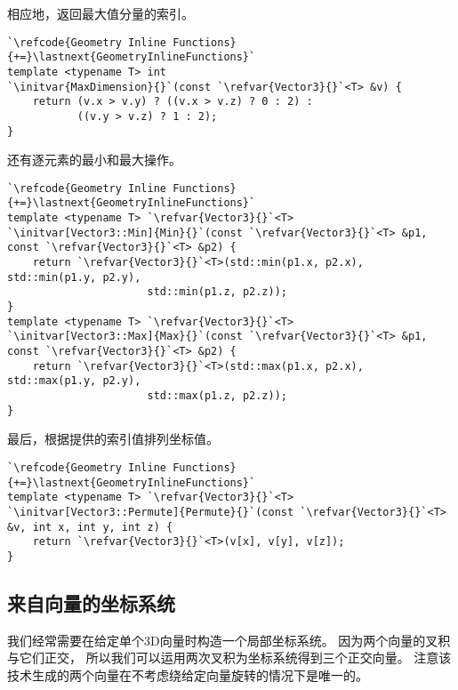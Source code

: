 相应地，返回最大值分量的索引。
\begin{lstlisting}
`\refcode{Geometry Inline Functions}{+=}\lastnext{GeometryInlineFunctions}`
template <typename T> int
`\initvar{MaxDimension}{}`(const `\refvar{Vector3}{}`<T> &v) {
    return (v.x > v.y) ? ((v.x > v.z) ? 0 : 2) : 
           ((v.y > v.z) ? 1 : 2);
}
\end{lstlisting}

还有逐元素的最小和最大操作。
\begin{lstlisting}
`\refcode{Geometry Inline Functions}{+=}\lastnext{GeometryInlineFunctions}`
template <typename T> `\refvar{Vector3}{}`<T>
`\initvar[Vector3::Min]{Min}{}`(const `\refvar{Vector3}{}`<T> &p1, const `\refvar{Vector3}{}`<T> &p2) {
    return `\refvar{Vector3}{}`<T>(std::min(p1.x, p2.x), std::min(p1.y, p2.y), 
                      std::min(p1.z, p2.z));
}
template <typename T> `\refvar{Vector3}{}`<T>
`\initvar[Vector3::Max]{Max}{}`(const `\refvar{Vector3}{}`<T> &p1, const `\refvar{Vector3}{}`<T> &p2) {
    return `\refvar{Vector3}{}`<T>(std::max(p1.x, p2.x), std::max(p1.y, p2.y), 
                      std::max(p1.z, p2.z));
}
\end{lstlisting}

最后，根据提供的索引值排列坐标值。
\begin{lstlisting}
`\refcode{Geometry Inline Functions}{+=}\lastnext{GeometryInlineFunctions}`
template <typename T> `\refvar{Vector3}{}`<T>
`\initvar[Vector3::Permute]{Permute}{}`(const `\refvar{Vector3}{}`<T> &v, int x, int y, int z) {
    return `\refvar{Vector3}{}`<T>(v[x], v[y], v[z]);
}
\end{lstlisting}

\subsection{来自向量的坐标系统}\label{sub:来自向量的坐标系统}
我们经常需要在给定单个3D向量时构造一个局部坐标系统。
因为两个向量的叉积与它们正交，
所以我们可以运用两次叉积为坐标系统得到三个正交向量。
注意该技术生成的两个向量在不考虑绕给定向量旋转的情况下是唯一的。

